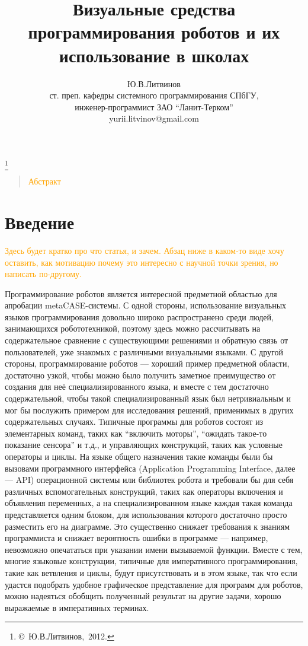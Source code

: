 \documentclass[a4paper]{article}
\title{Визуальные средства программирования роботов и их использование в школах}
\author{Ю.В.Литвинов \\ ст. преп. кафедры системного программирования СПбГУ, \\ инженер-программист ЗАО ``Ланит-Терком'' \\ yurii.litvinov@gmail.com}
\date{}
\begin{document}
\maketitle
\thispagestyle{empty}

\renewcommand{\thefootnote}{}
\footnote{\small{\copyright~Ю.В.Литвинов,~2012.}}
\renewcommand{\thefootnote}{\arabic{footnote}}
\setcounter{footnote}{0}

\begin{quote}
\small\noindent
\textcolor{Orange}{Абстракт}
\end{quote}

\section*{Введение}
\textcolor{Orange}{Здесь будет кратко про что статья, и зачем. Абзац ниже в каком-то виде хочу оставить, как мотивацию почему это интересно с научной точки зрения, но написать по-другому.}

Программирование роботов является интересной предметной областью для апробации metaCASE-системы. С одной стороны, использование визуальных языков программирования довольно широко распространено среди людей, занимающихся робототехникой, поэтому здесь можно рассчитывать на содержательное сравнение с существующими решениями и обратную связь от пользователей, уже знакомых с различными визуальными языками. С другой стороны, программирование роботов --- хороший пример предметной области, достаточно узкой, чтобы можно было получить заметное преимущество от создания для неё специализированного языка, и вместе с тем достаточно содержательной, чтобы такой специализированный язык был нетривиальным и мог бы послужить примером для исследования решений, применимых в других содержательных случаях. Типичные программы для роботов состоят из элементарных команд, таких как ``включить моторы'', ``ожидать такое-то показание сенсора'' и т.д., и управляющих конструкций, таких как условные операторы и циклы. На языке общего назначения такие команды были бы вызовами программного интерфейса (Application Programming Interface, далее --- API) операционной системы или библиотек робота и требовали бы для себя различных вспомогательных конструкций, таких как операторы включения и объявления переменных, а на специализированном языке каждая такая команда представляется одним блоком, для использования которого достаточно просто разместить его на диаграмме. Это существенно снижает требования к знаниям программиста и снижает вероятность ошибки в программе --- например, невозможно опечататься при указании имени вызываемой функции. Вместе с тем, многие языковые конструкции, типичные для императивного программирования, такие как ветвления и циклы, будут присутствовать и в этом языке, так что если удастся подобрать удобное графическое представление для программ для роботов, можно надеяться обобщить полученный результат на другие задачи, хорошо выражаемые в императивных терминах.
\end{document}
